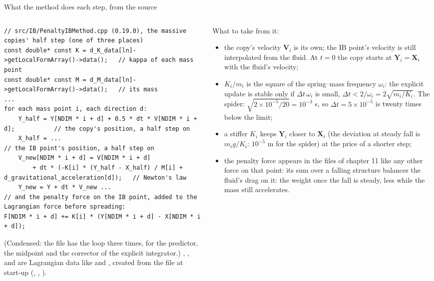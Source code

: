 \documentclass[aspectratio=169,11pt]{beamer}
\begin{document}
\begin{frame}[fragile]{What the method does each step, from the source}
\label{fr:update}
\begin{columns}[T,onlytextwidth]
\begin{column}{0.56\textwidth}
\begin{lstlisting}[style=cpptiny]
// src/IB/PenaltyIBMethod.cpp (0.19.0), the massive copies' half step (one of three places)
const double* const K = d_K_data[ln]->getLocalFormArray()->data();   // kappa of each mass point
const double* const M = d_M_data[ln]->getLocalFormArray()->data();   // its mass
...
for each mass point i, each direction d:
    Y_half = Y[NDIM * i + d] + 0.5 * dt * V[NDIM * i + d];           // the copy's position, a half step on
    X_half = ...                                                       // the IB point's position, a half step on
    V_new[NDIM * i + d] = V[NDIM * i + d]
        + dt * (-K[i] * (Y_half - X_half) / M[i] + d_gravitational_acceleration[d]);   // Newton's law
    Y_new = Y + dt * V_new ...
// and the penalty force on the IB point, added to the Lagrangian force before spreading:
F[NDIM * i + d] += K[i] * (Y[NDIM * i + d] - X[NDIM * i + d]);
\end{lstlisting}
\footnotesize (Condensed: the file has the loop three times, for the predictor, the midpoint and the corrector of the explicit integrator.) , ,  and  are Lagrangian data like  and , created from the  file at start-up (, , ).
\end{column}
\begin{column}{0.42\textwidth}
\scriptsize What to take from it:
\begin{itemize}
  \item the copy's velocity $\mathbf{V}_i$ is its own; the IB point's velocity is still interpolated from the fluid. At $t = 0$ the copy starts at $\mathbf{Y}_i = \mathbf{X}_i$ with the fluid's velocity;
  \item $K_i/m_i$ is the square of the spring--mass frequency $\omega_i$: the explicit update is stable only if $\Delta t\,\omega_i$ is small, $\Delta t < 2/\omega_i = 2\sqrt{m_i/K_i}$. The spider: $\sqrt{2\times10^{-5}/20} = 10^{-3}$ s, so $\Delta t = 5\times10^{-5}$ is twenty times below the limit;
  \item a stiffer $K_i$ keeps $\mathbf{Y}_i$ closer to $\mathbf{X}_i$ (the deviation at steady fall is $m_i g/K_i$: $10^{-5}$ m for the spider) at the price of a shorter step;
  \item the penalty force appears in the  files of chapter 11 like any other force on that point: its sum over a falling structure balances the fluid's drag on it: the weight once the fall is steady, less while the mass still accelerates.
\end{itemize}
\end{column}
\end{columns}
\end{frame}
\end{document}
